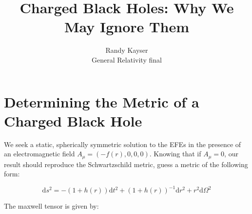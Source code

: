 \documentclass{article}
\newcommand*\dif{\mathrm{d}}
\begin{document}
\title{Charged Black Holes: Why We May Ignore Them}
\author{Randy Kayser\\ General Relativity final}

\maketitle

\section{Determining the Metric of a Charged Black Hole}
We seek a static, spherically symmetric solution to the EFEs in the presence of an electromagnetic field $A_{\mu} = (-f(r), 0,0,0)$. Knowing that if $A_{\mu} = 0$, our result should reproduce the Schwartzschild metric, guess a metric of the following form:

\begin{equation*}
   \dif s^2 = -(1+h(r))\dif t^2 + (1 + h(r))^{-1}\dif r^2 + r^2 \dif \Omega^2
\end{equation*}

The maxwell tensor is given by:
\end{document}
